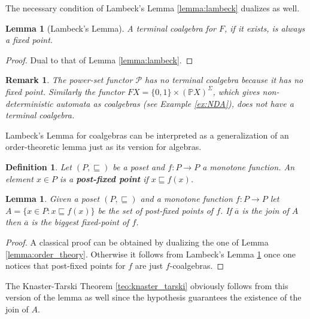 \documentclass[letterpaper, 11pt, oneside]{memoir}
\theoremstyle{myteo}
\newtheorem{lemma}[theorem]{Lemma}
\newtheorem{definition}[theorem]{Definition}
\newtheorem{remark}[theorem]{Remark}
\numberwithin{equation}{section}
\begin{document}
The necessary condition of Lambeck's Lemma \ref{lemma:lambeck} dualizes as well.

\begin{lemma}[Lambeck's Lemma]
  \label{lemma:colambeck}
  A terminal coalgebra for \(F\), if it exists, is always a fixed point.
\end{lemma}

\begin{proof}
  Dual to that of Lemma \ref{lemma:lambeck}.
\end{proof}

\begin{remark}
  \label{rem:powset-no-term-coalgebra}
  The power-set functor \(\mathcal{P}\) has no terminal coalgebra because it has no fixed point.
  Similarly the functor \(FX = \{0, 1\} \times (\mathbb{P}X)^\Sigma\), which gives non-deterministic automata as coalgebras (see Example \ref{ex:NDA}), does not have a terminal coalgebra.
\end{remark}

Lambeck's Lemma for coalgebras can be interpreted as a generalization of an order-theoretic lemma just as its version for algebras.

\begin{definition}
  Let \((P, \sqsubseteq)\) be a poset and \(f: P \to P\) a monotone function.
  An element \(x \in P\) is a \textbf{post-fixed point} if \(x \sqsubseteq f(x)\).
\end{definition}

\begin{lemma}
  Given a poset \((P, \sqsubseteq)\) and a monotone function \(f: P \to P\) let \(A = \{x \in P : x \sqsubseteq f(x)\}\) be the set of post-fixed points of \(f\).
  If \(\overline{a}\) is the join of \(A\) then \(\overline{a}\) is the biggest fixed-point of \(f\).
\end{lemma}

\begin{proof}
  A classical proof can be obtained by dualizing the one of Lemma \ref{lemma:order_theory}.
  Otherwise it follows from Lambeck's Lemma \ref{lemma:colambeck} once one notices that post-fixed points for \(f\) are just \(f\)-coalgebras.
\end{proof}

The Knaster-Tarski Theorem \ref{teo:knaster_tarski} obviously follows from this version of the lemma as well since the hypothesis guarantees the existence of the join of \(A\).
\end{document}
